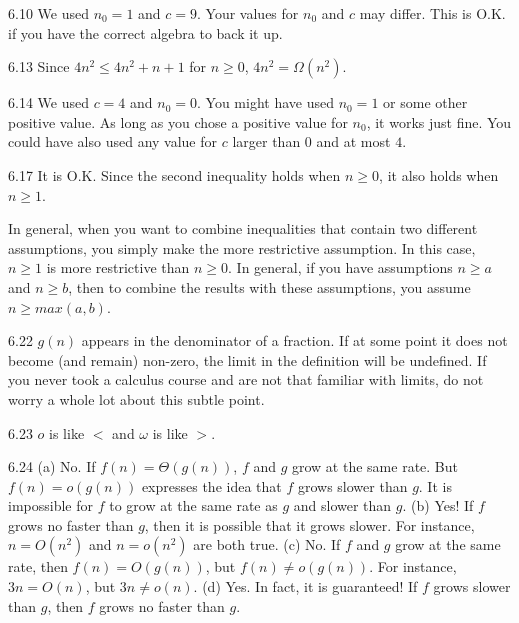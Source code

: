 \begin{Answer}{6.10}
We used $n_0=1$ and $c=9$.
Your values for $n_0$ and $c$ may differ.
This is O.K. if you have the correct algebra to back it up.
\end{Answer}
\begin{Answer}{6.13}
Since $4n^2\leq 4n^2+n+1$ for $n\geq 0$, $4n^2=\Omega(n^2)$.
\end{Answer}
\begin{Answer}{6.14}
We used $c=4$ and $n_0=0$.  You might have used $n_0=1$ or some other positive value.
As long as you chose a positive value for $n_0$, it works just fine.  You could have also
used any value for $c$ larger than $0$ and at most $4$.
\end{Answer}
\begin{Answer}{6.17}
It is O.K.  Since the second inequality holds when $n\geq 0$, it also holds when $n\geq 1$.

In general, when you want to combine inequalities that contain two different assumptions,
you simply make the more restrictive assumption.  In this case, $n\geq 1$ is more restrictive
than $n\geq 0$.  In general, if you have assumptions $n\geq a$ and $n\geq b$, then to combine
the results with these assumptions, you assume $n\geq max(a,b)$.
\end{Answer}
\begin{Answer}{6.22}
$g(n)$ appears in the denominator of a fraction.  If at some point it does not become
(and remain) non-zero, the limit in the definition will be undefined.
If you never took a calculus course and are not that familiar with limits,
do not worry a whole lot about this subtle point.
\end{Answer}
\begin{Answer}{6.23}
$o$ is like $<$ and $\omega$ is like $>$.
\end{Answer}
\begin{Answer}{6.24}
(a) No.  If $f(n)=\Theta(g(n))$, $f$ and $g$ grow at the same rate.  But
$f(n)=o(g(n))$ expresses the idea that $f$ grows slower than $g$.
It is impossible for $f$ to grow at the same rate as $g$ and slower than $g$.
(b) Yes!  If $f$ grows no faster than $g$, then it is possible that it grows slower.
For instance, $n=O(n^2)$ and $n=o(n^2)$ are both true.
(c) No.  If $f$ and $g$ grow at the same rate, then $f(n)=O(g(n))$, but
$f(n)\neq o(g(n))$. For instance, $3n=O(n)$, but $3n\neq o(n)$.
(d) Yes.  In fact, it is guaranteed!  If $f$ grows slower than $g$, then
$f$ grows no faster than $g$.
\end{Answer}
